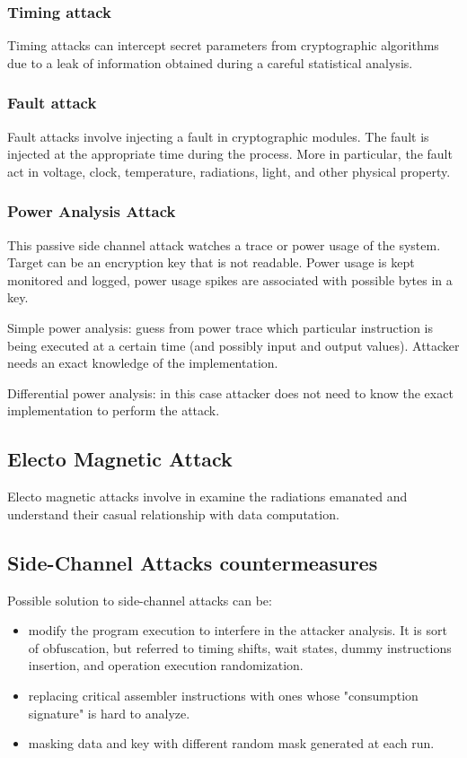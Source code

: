 \subsubsection{Timing attack}
Timing attacks can intercept secret parameters from cryptographic algorithms due to a leak of information obtained during a careful statistical analysis. 

\subsubsection{Fault attack}
Fault attacks involve injecting a fault in cryptographic modules.
The fault is injected at the appropriate time during the process. 
More in particular, the fault act in voltage, clock, temperature, radiations, light, and other physical property. 

\subsubsection{Power Analysis Attack}
This passive side channel attack watches a trace or power usage of the system. 
Target can be an encryption key that is not readable.
Power usage is kept monitored and logged, power usage spikes are associated with possible bytes in a key.\newline

Simple power analysis: guess from power trace which particular instruction is being executed at a certain time (and possibly input and output values). Attacker needs an exact knowledge of the implementation.\newline

Differential power analysis: in this case attacker does not need to know the exact implementation to perform the attack. 

\subsection{Electo Magnetic Attack}
Electo magnetic attacks involve in examine the radiations emanated and understand their casual relationship with data computation. 

\subsection{Side-Channel Attacks countermeasures}

Possible solution to side-channel attacks can be: 
\begin{itemize}
    \item modify the program execution to interfere in the attacker analysis. It is sort of obfuscation, but referred to timing shifts, wait states, dummy instructions insertion, and operation execution randomization.
    \item replacing critical assembler instructions with ones whose "consumption signature" is hard to analyze.
    \item masking data and key with different random mask generated at each run.
\end{itemize}